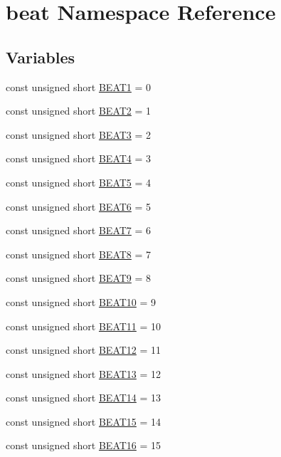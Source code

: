 \hypertarget{namespacebeat}{}\section{beat Namespace Reference}
\label{namespacebeat}
\subsection*{Variables}
\begin{DoxyCompactItemize}
\item 
const unsigned short \hyperlink{namespacebeat_ae859561033de8f2140542a8bea7d5f02}{B\+E\+A\+T1} = 0
\item 
const unsigned short \hyperlink{namespacebeat_a219eb8f5f0218df3af3f4d4d9214327f}{B\+E\+A\+T2} = 1
\item 
const unsigned short \hyperlink{namespacebeat_a0ccf0d5bdc6dfdae1fd7b1667655a18f}{B\+E\+A\+T3} = 2
\item 
const unsigned short \hyperlink{namespacebeat_acb66407079f4f750c8edf7c1bd8519df}{B\+E\+A\+T4} = 3
\item 
const unsigned short \hyperlink{namespacebeat_a1707525607992183af84b75b13bdcf1c}{B\+E\+A\+T5} = 4
\item 
const unsigned short \hyperlink{namespacebeat_a38be39fd5d7424553131d77620a5fbfc}{B\+E\+A\+T6} = 5
\item 
const unsigned short \hyperlink{namespacebeat_af4ce75f48a22e0f3aacded8385030cad}{B\+E\+A\+T7} = 6
\item 
const unsigned short \hyperlink{namespacebeat_a564212b647573e2f3fce876049227d2c}{B\+E\+A\+T8} = 7
\item 
const unsigned short \hyperlink{namespacebeat_a6558138490436cdf9a77d90ffd07e092}{B\+E\+A\+T9} = 8
\item 
const unsigned short \hyperlink{namespacebeat_abd0eb0f3160a3579b574ffa8bf94282c}{B\+E\+A\+T10} = 9
\item 
const unsigned short \hyperlink{namespacebeat_a4ba76b47d18db4674af1ca28136614e2}{B\+E\+A\+T11} = 10
\item 
const unsigned short \hyperlink{namespacebeat_ae84780c2b37cac562b4f9e7676d7a715}{B\+E\+A\+T12} = 11
\item 
const unsigned short \hyperlink{namespacebeat_a0056cac49aa9cd40c0532068b40322fe}{B\+E\+A\+T13} = 12
\item 
const unsigned short \hyperlink{namespacebeat_aa25c9d3e796af023ea86fc1181ff4732}{B\+E\+A\+T14} = 13
\item 
const unsigned short \hyperlink{namespacebeat_a241a13409659dff75e5368358447fc73}{B\+E\+A\+T15} = 14
\item 
const unsigned short \hyperlink{namespacebeat_ad619f02c1a78c30570d7371411f1ef47}{B\+E\+A\+T16} = 15
\end{DoxyCompactItemize}


